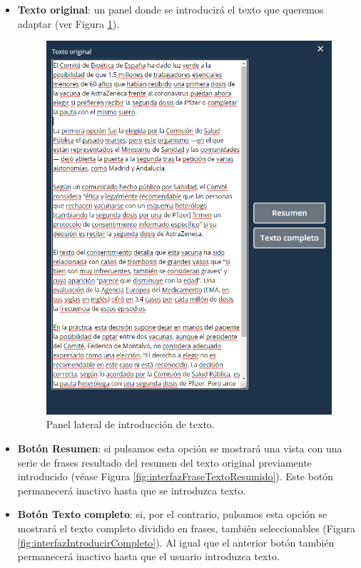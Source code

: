  \begin{itemize}
 	\item \textbf{Texto original}: un  panel donde se introducirá el texto que queremos adaptar (ver Figura \ref{fig:interfazIntroduccionTexto}).
 	\begin{figure}[h!]
 		\centering
 		
 		
 		\includegraphics[scale=0.7]{Imagenes/Figuras/PanelIzquierdo}
 		
 		
 		\caption{Panel lateral de introducción de texto.}
 		\label{fig:interfazIntroduccionTexto}
 	\end{figure}
 	 	\item \textbf{Botón Resumen}: si pulsamos esta opción se mostrará una vista con una serie de frases resultado del resumen del texto original previamente introducido (véase Figura \ref{fig:interfazFraseTextoResumido}). Este botón permanecerá inactivo hasta que se introduzca texto. 
 	 	 	\item \textbf{Botón Texto completo}: si, por el contrario, pulsamos esta opción se mostrará el texto completo dividido en frases, también seleccionables (Figura \ref{fig:interfazIntroducirCompleto}). Al igual que el anterior botón también permanecerá inactivo hasta que el usuario introduzca texto. 
 	 	 \begin{figure}[h!]
 	 	 	\centering
 	 	 	

\end{figure}
\end{itemize}

